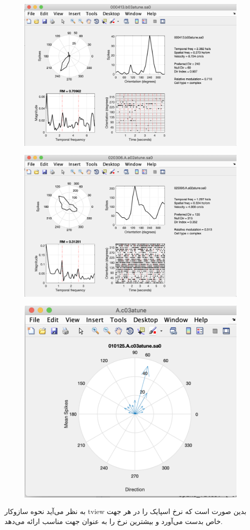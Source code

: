 \documentclass[12 pt]{article}
\begin{document}
		\begin{figure}[H]
	\centering
	\includegraphics[height=0.5\linewidth, width = 0.7\linewidth]{d.png}
	\caption*{}
\end{figure}
		\begin{figure}[H]
	\centering
	\includegraphics[height=0.5\linewidth, width = 0.7\linewidth]{e.png}
	\caption*{}
\end{figure}
		\begin{figure}[H]
	\centering
	\includegraphics[height=0.5\linewidth, width = 0.7\linewidth]{f.png}
	\caption*{}
\end{figure}
به نظر می‌آید نحوه سازوکار tview بدین صورت است که نرخ اسپایک را در هر جهت خاص بدست می‌آورد و بیشترین نرخ را به عنوان جهت مناسب ارائه می‌دهد.
\end{document}
